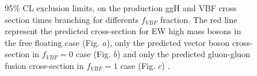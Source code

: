 \begin{figure}[htb]
\centering




\caption{95$\%$ CL exclusion limits,  on the production ggH and VBF cross section times branching for differents $f_{VBF}$ fraction.  The red  line represent the predicted cross-section for EW high mass bosons in  the free floating case (Fig. $a$), only the predicted vector boson cross-section in $f_{VBF}=0$ case (Fig. $b$) 
and only the predicted gluon-gluon fusion cross-section in $f_{VBF}=1$ case (Fig. $c$)  .}
    \label{fig:UL_fvbf}
\end{figure}


